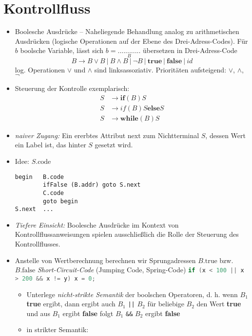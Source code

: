 \section{Kontrollfluss}
\begin{itemize}
 \item Boolesche Ausdrücke -- Naheliegende Behandlung analog zu arithmetischen Ausdrücken (logische Operationen auf der Ebene des Drei-Adress-Codes). Für $b$ boolsche Variable, lässt sich $b = \underset{B}{............}$ übersetzen in Drei-Adress-Code
 \[B \to B \lor B\ |\ B \land B\ |\ \neg B\ |\ \textbf{true}\ |\ \textbf{false}\ |\ id\]
 log. Operationen $\lor$ und $\land$ sind linksassoziativ. Prioritäten aufsteigend: $\lor$, $\land$, $\neg$
 \item Steuerung der Kontrolle exemplarisch:
     \begin{align*}
      S &\to \textbf{if} (B) S \\
      S &\to \textit{if} (B) S \textbf{else} S \\
      S &\to \textbf{while} (B) S
     \end{align*}
 \item \emph{naiver Zugang:} Ein ererbtes Attribut next zum Nichtterminal $S$, dessen Wert ein Label ist, das hinter $S$ gesetzt wird.
 \item Idee: $S.\text{code}$
         \begin{verbatim}
begin   B.code
        ifFalse (B.addr) goto S.next
        C.code
        goto begin
S.next  ...
         \end{verbatim}
 \item \emph{Tiefere Einsicht:} Boolesche Ausdrücke im Kontext von Kontrollflussanweisungen spielen ausschließlich die Rolle der Steuerung des Kontrollflusses. 
 \item Anstelle von Wertberechnung berechnen wir Sprungadressen $B.\text{true}$ bzw. $B.\text{false}$ \emph{Short-Circuit-Code} (Jumping Code, Spring-Code)
 \Bsp  \lstinline[language=Java]$if (x < 100 || x > 200 && x != y) x = 0;$
     \begin{itemize}
      \item Unterlege \emph{nicht-strikte Semantik} der boolschen Operatoren, d. h. wenn $B_1$ \textbf{true} ergibt, dann ergibt auch $B_1$ \texttt{||} $B_2$ für beliebige $B_2$ den Wert \textbf{true} und aus $B_1$ ergibt \textbf{false} folgt $B_1$ \verb!&&! $B_2$ ergibt \textbf{false}
      \item in strikter Semantik:
      \begin{center}
       \begin{tabular}{r|c|c|c}

\end{tabular}
\end{center}
\end{itemize}
\end{itemize}
